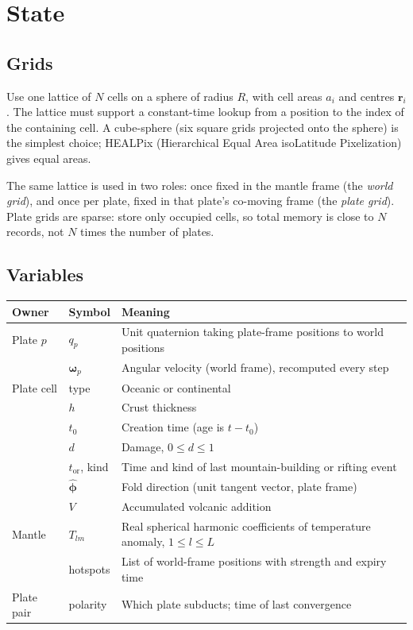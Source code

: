 \documentclass[11pt,a4paper]{article}
\newcommand{\vect}[1]{\bm{#1}}
\newcommand{\rr}{\vect{r}}
\newcommand{\om}{\vect{\omega}}
\begin{document}
\section{State}

\subsection{Grids}

Use one lattice of $N$ cells on a sphere of radius $R$, with cell areas $a_i$
and centres $\rr_i$. The lattice must support a constant-time lookup from a
position to the index of the containing cell. A cube-sphere (six square grids
projected onto the sphere) is the simplest choice; HEALPix (Hierarchical Equal
Area isoLatitude Pixelization) gives equal areas.

The same lattice is used in two roles: once fixed in the mantle frame (the
\emph{world grid}), and once per plate, fixed in that plate's co-moving frame
(the \emph{plate grid}). Plate grids are sparse: store only occupied cells, so
total memory is close to $N$ records, not $N$ times the number of plates.

\subsection{Variables}

\begin{table}[h]
\centering
\begin{tabularx}{\textwidth}{@{}llX@{}}
\toprule
Owner & Symbol & Meaning \\
\midrule
Plate $p$ & $q_p$ & Unit quaternion taking plate-frame positions to world positions \\
          & $\om_p$ & Angular velocity (world frame), recomputed every step \\
Plate cell & type & Oceanic or continental \\
          & $h$ & Crust thickness \\
          & $t_0$ & Creation time (age is $t - t_0$) \\
          & $d$ & Damage, $0 \le d \le 1$ \\
          & $t_\mathrm{or}$, kind & Time and kind of last mountain-building or rifting event \\
          & $\hat{\vect{\phi}}$ & Fold direction (unit tangent vector, plate frame) \\
          & $V$ & Accumulated volcanic addition \\
Mantle & $T_{lm}$ & Real spherical harmonic coefficients of temperature anomaly, $1 \le l \le L$ \\
       & hotspots & List of world-frame positions with strength and expiry time \\
Plate pair & polarity & Which plate subducts; time of last convergence \\
\bottomrule
\end{tabularx}
\end{table}
\end{document}
